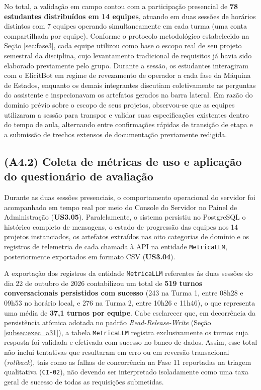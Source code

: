 No total, a validação em campo contou com a participação presencial de \textbf{78 estudantes distribuídos em 14 equipes}, atuando em duas sessões de horários distintos com 7 equipes operando simultaneamente em cada turma (uma conta compartilhada por equipe). Conforme o protocolo metodológico estabelecido na Seção \ref{sec:fase3}, cada equipe utilizou como base o escopo real de seu projeto semestral da disciplina, cujo levantamento tradicional de requisitos já havia sido elaborado previamente pelo grupo. Durante a sessão, os estudantes interagiram com o ElicitBot em regime de revezamento de operador a cada fase da Máquina de Estados, enquanto os demais integrantes discutiam coletivamente as perguntas do assistente e inspecionavam os artefatos gerados na barra lateral. Em razão do domínio prévio sobre o escopo de seus projetos, observou-se que as equipes utilizaram a sessão para transpor e validar suas especificações existentes dentro do tempo de aula, alternando entre confirmações rápidas de transição de etapa e a submissão de trechos extensos de documentação previamente redigida.

\subsection{(A4.2) Coleta de métricas de uso e aplicação do questionário de avaliação}
\label{subsec:exec_a42}

Durante as duas sessões presenciais, o comportamento operacional do servidor foi acompanhado em tempo real por meio do Console do Servidor no Painel de Administração (\textbf{US3.05}). Paralelamente, o sistema persistiu no PostgreSQL o histórico completo de mensagens, o estado de progressão das equipes nos 14 projetos instanciados, os artefatos extraídos nas oito categorias de domínio e os registros de telemetria de cada chamada à API na entidade \texttt{MetricaLLM}, posteriormente exportados em formato CSV (\textbf{US3.04}).

A exportação dos registros da entidade \texttt{MetricaLLM} referentes às duas sessões do dia 22 de outubro de 2026 contabilizou um total de \textbf{519 turnos conversacionais persistidos com sucesso} (243 na Turma 1, entre 08h28 e 09h53 no horário local, e 276 na Turma 2, entre 10h26 e 11h46), o que representa uma média de \textbf{37,1 turnos por equipe}. Cabe esclarecer que, em decorrência da persistência atômica adotada no padrão \textit{Read-Release-Write} (Seção \ref{subsec:exec_a31}), a tabela \texttt{MetricaLLM} registra exclusivamente os turnos cuja resposta foi validada e efetivada com sucesso no banco de dados. Assim, esse total não inclui tentativas que resultaram em erro ou em reversão transacional (\textit{rollback}), tais como as falhas de concorrência na Fase 11 reportadas na triagem qualitativa (\texttt{CI-02}), não devendo ser interpretado isoladamente como uma taxa geral de sucesso de todas as requisições submetidas.

